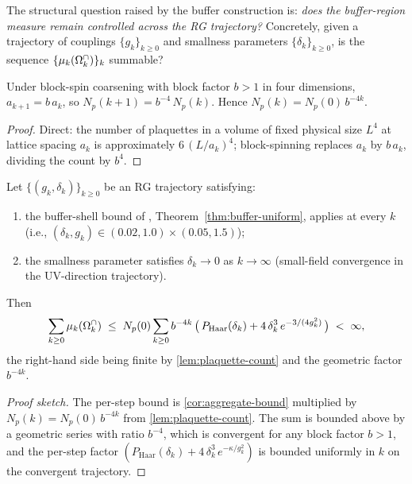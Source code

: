 The structural question raised by the buffer construction is:
\emph{does the buffer-region measure remain controlled across the
RG trajectory?}  Concretely, given a trajectory of couplings
$\{g_k\}_{k \ge 0}$ and smallness parameters $\{\delta_k\}_{k \ge 0}$,
is the sequence $\{\mu_k(\Omega_k^{\cap})\}_k$ summable?

%

\begin{lemma}
\label{lem:plaquette-count}
Under block-spin coarsening with block factor $b > 1$ in four
dimensions, $a_{k+1} = b\, a_k$, so $N_p(k+1) = b^{-4}\, N_p(k)$.
Hence $N_p(k) = N_p(0)\, b^{-4k}$.
\end{lemma}

\begin{proof}
Direct: the number of plaquettes in a volume of fixed physical size
$L^4$ at lattice spacing $a_k$ is approximately $6\,(L/a_k)^4$;
block-spinning replaces $a_k$ by $b\,a_k$, dividing the count by
$b^4$.
\end{proof}

\begin{theorem}
\label{thm:union-summability}
Let $\{(g_k, \delta_k)\}_{k \ge 0}$ be an RG trajectory satisfying:
\begin{enumerate}[label=(\arabic*)]
  \item the buffer-shell bound of ,
    Theorem~\ref{thm:buffer-uniform}, applies at every $k$ (i.e.,
    $(\delta_k, g_k) \in (0.02, 1.0) \times (0.05, 1.5)$);
  \item the smallness parameter satisfies $\delta_k \to 0$ as
    $k \to \infty$ (small-field convergence in the UV-direction
    trajectory).
\end{enumerate}
Then
\begin{equation}
  \label{eq:union-summability}
  \sum_{k \ge 0} \mu_k(\Omega_k^{\cap})
  \;\le\;
  N_p(0) \sum_{k \ge 0} b^{-4k}\,
    \bigl(\,P_{\mathrm{Haar}}(\delta_k) + 4\,\delta_k^3\,e^{-3/(4 g_k^2)}\,\bigr)
  \;<\; \infty,
\end{equation}
the right-hand side being finite by \cref{lem:plaquette-count} and
the geometric factor $b^{-4k}$.
\end{theorem}

\begin{proof}[Proof sketch]
The per-step bound is \cref{cor:aggregate-bound} multiplied by
$N_p(k) = N_p(0)\,b^{-4k}$ from \cref{lem:plaquette-count}.  The
sum is bounded above by a geometric series with ratio $b^{-4}$,
which is convergent for any block factor $b > 1$, and the per-step
factor $(P_{\mathrm{Haar}}(\delta_k) + 4\,\delta_k^3\,e^{-\kappa/g_k^2})$
is bounded uniformly in $k$ on the convergent trajectory.
\end{proof}

